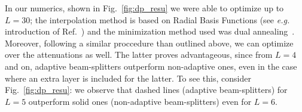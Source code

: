 

In our numerics, shown in Fig.~\ref{fig:dp_resu} we were able to optimize up to $L=30$; the interpolation method is based on Radial Basis Functions (see \textit{e.g.} introduction of Ref.~\cite{rbf_interpolate}) and the minimization method used was dual annealing~\cite{scipy}. Moreover, following a similar proccedure than outlined above, we can optimize over the attenuations as well. The latter proves advantageous, since from $L=4$ and on, adaptive beam-splitters outperform non-adaptive ones, even in the case where an extra layer is included for the latter. To see this, consider Fig.~\ref{fig:dp_resu}: we observe that dashed lines (adaptive beam-splitters) for $L=5$ outperform solid ones (non-adaptive beam-splitters) even for $L=6$.

